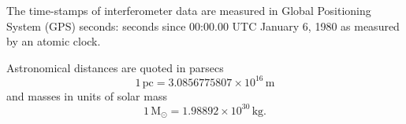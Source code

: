 \documentclass[12pt,notitlepage]{report}
\begin{document}
\vspace{0.5cm}

\noindent The time-stamps of interferometer data are measured in Global
Positioning System (GPS) seconds: seconds since 00:00.00 UTC January 6, 1980
as measured by an atomic clock.

\vspace{0.5cm}

\noindent Astronomical distances are quoted in parsecs
\begin{equation*}
1\,\mathrm{pc} = 3.0856775807 \times 10^{16}\,\mathrm{m}
\end{equation*}
and masses in units of solar mass
\begin{equation*}
1\,\mathrm{M}_\odot = 1.98892 \times 10^{30}\,\mathrm{kg}.
\end{equation*}

\afterpreface

\label{ch:introduction}

\label{ch:inspiral}

\label{ch:macho}

\label{ch:findchirp}

\label{ch:pipeline}

\label{ch:hardware}

%
\label{ch:result}

\label{ch:conclusion}


\clearpage



\clearpage
{}

\begin{startvita}
\end{startvita}

\renewenvironment{thebibliography}[1]%
  {\begin{list}{\labelenumi\hss}%
     {\usecounter{enumi}\setlength{\labelwidth}{3em}%
      \setlength{\leftmargin}{5em}}}%
  {\end{list}}
\renewcommand{\bibitem}[1]{\item\label{#1}\relax}%
\renewcommand{\theenumi}{\arabic{enumi}}%
\begin{publications}
\putbib[papers]
\end{publications}

\finishvita
\end{document}
